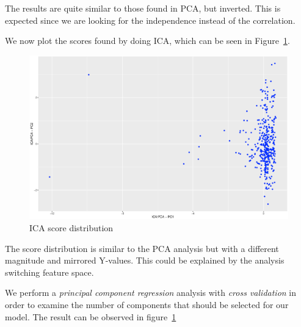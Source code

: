 \documentclass[a4paper,12pt]{article}
\begin{document}
    The results are quite similar to those found in PCA, but inverted. This is expected since we are looking for the independence instead of the correlation.

    We now plot the scores found by doing ICA, which can be seen in Figure~\ref{fig:icascores}.
    \begin{figure}[H]          
    \centering
    \caption{ICA score distribution}
    \label{fig:icascores}
    \includegraphics[width=\textwidth]{figures/A2_icascore.eps}
    \end{figure}

    The score distribution is similar to the PCA analysis but with a different magnitude and mirrored Y-values. This could be explained by the analysis switching feature space.

    We perform a \emph{principal component regression} analysis with \emph{cross validation} in order to examine the number of components that should be selected for our model. The result can be observed in figure~\ref{fig:icascores}
\end{document}
